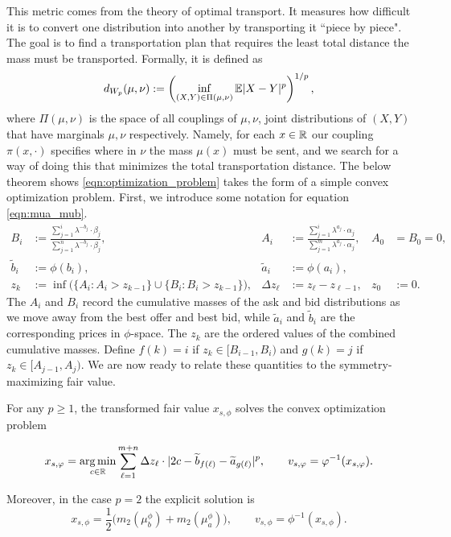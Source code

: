 This metric comes from the theory of optimal transport. It measures how
 difficult it is to convert one distribution into another by transporting
 it ``piece by piece". The goal is to find a transportation plan that
 requires the least total distance the mass must be transported.
 Formally, it is defined as
%
\[d_{W_p}(\mu, \nu) := \left( \inf_{(X,Y) \in \Pi(\mu, \nu)} \mathbb{E} |X-Y|^p \right)^{1/p},\]
%
\noindent where $\Pi(\mu, \nu)$ is the space of all couplings of $\mu, \nu$, joint distributions of $(X,Y)$ that have marginals $\mu, \nu$ respectively. Namely, for each $x \in \mathbb{R}$ our coupling $\pi(x, \cdot)$ specifies where in $\nu$ the mass $\mu(x)$ must be sent, and we search for a way of doing this that minimizes the total transportation distance. The below theorem shows \eqref{eqn:optimization_problem} takes the form of a simple convex optimization problem. First, we introduce some notation for equation \eqref{eqn:mua_mub}.
%
\begin{align*}
    B_i &:= \frac{\sum_{j=1}^i\lambda^{-b_j} \cdot \beta_j}{\sum_{j=1}^n \lambda^{-b_j} \cdot \beta_j},
    &A_i &:= \frac{\sum_{j=1}^i\lambda^{a_j} \cdot \alpha_j}{\sum_{j=1}^m \lambda^{a_j} \cdot \alpha_j},
    &A_0&=B_0=0,\\
    \widetilde b_i&:=\phi(b_i),
    &\widetilde a_i&:=\phi(a_i),\\
    z_k &:= \inf \bigl(\{A_i:A_i>z_{k-1}\}\cup\{B_i:B_i>z_{k-1}\}\bigr),
    &\Delta z_\ell&:=z_\ell-z_{\ell-1},
    &z_0&:=0.
\end{align*}
%
\noindent The $A_i$ and $B_i$ record the cumulative masses of the ask and bid
distributions as we move away from the best offer and best bid, while
$\widetilde a_i$ and $\widetilde b_i$ are the corresponding prices in
$\phi$-space. The $z_k$ are the ordered values of the combined cumulative
masses. Define $f(k)=i$ if $z_k\in[B_{i-1},B_i)$ and $g(k)=j$ if
$z_k\in[A_{j-1},A_j)$. We are now ready to relate these quantities to the
symmetry-maximizing fair value.
%
\begin{theorem}
\label{thm:wasserstein_solution}
    For any $p \geq 1$, the transformed fair value $x_{s,\phi}$ solves the convex optimization problem

    \begin{equation}
    x_{s,\varphi} = \operatorname*{arg\,min}_{c \in \mathbb R} \sum_{\ell = 1}^{m+n} \Delta z_\ell \cdot
    |2c - \widetilde b_{f(\ell)} - \widetilde a_{g(\ell)}|^p,
    \qquad v_{s,\varphi}=\varphi^{-1}(x_{s,\varphi}).
    \end{equation}

    \noindent Moreover, in the case $p = 2$ the explicit solution is
    \begin{equation}
        x_{s,\phi}=\frac{1}{2}\Big(m_2(\mu_b^\phi)+m_2(\mu_a^\phi)\Big),
        \qquad v_{s,\phi}=\phi^{-1}(x_{s,\phi}).
        \label{eqn:explicit_soln_sym_fv}
    \end{equation}
\end{theorem}
